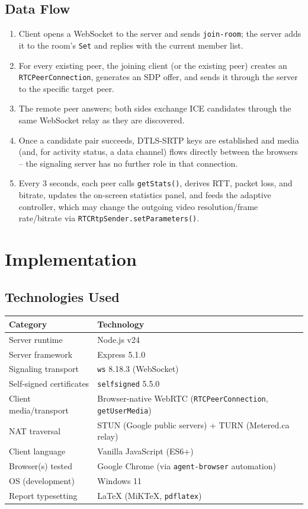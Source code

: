 \documentclass[12pt,a4paper]{report}
\begin{document}
\section{Data Flow}
\begin{enumerate}[nosep]
  \item Client opens a WebSocket to the server and sends \texttt{join-room}; the server adds
  it to the room's \texttt{Set} and replies with the current member list.
  \item For every existing peer, the joining client (or the existing peer) creates an
  \texttt{RTCPeerConnection}, generates an SDP offer, and sends it through the server to the
  specific target peer.
  \item The remote peer answers; both sides exchange ICE candidates through the same
  WebSocket relay as they are discovered.
  \item Once a candidate pair succeeds, DTLS-SRTP keys are established and media (and, for
  activity status, a data channel) flows directly between the browsers -- the signaling
  server has no further role in that connection.
  \item Every 3 seconds, each peer calls \texttt{getStats()}, derives RTT, packet loss, and
  bitrate, updates the on-screen statistics panel, and feeds the adaptive controller, which
  may change the outgoing video resolution/frame rate/bitrate via
  \texttt{RTCRtpSender.setParameters()}.
\end{enumerate}

\chapter{Implementation}

\section{Technologies Used}
\begin{center}
\begin{tabular}{ll}
\toprule
\textbf{Category} & \textbf{Technology} \\
\midrule
Server runtime & Node.js v24 \\
Server framework & Express 5.1.0 \\
Signaling transport & \texttt{ws} 8.18.3 (WebSocket) \\
Self-signed certificates & \texttt{selfsigned} 5.5.0 \\
Client media/transport & Browser-native WebRTC (\texttt{RTCPeerConnection}, \texttt{getUserMedia}) \\
NAT traversal & STUN (Google public servers) + TURN (Metered.ca relay) \\
Client language & Vanilla JavaScript (ES6+) \\
Browser(s) tested & Google Chrome (via \texttt{agent-browser} automation) \\
OS (development) & Windows 11 \\
Report typesetting & \LaTeX{} (MiKTeX, \texttt{pdflatex}) \\
\bottomrule
\end{tabular}
\end{center}
\end{document}
